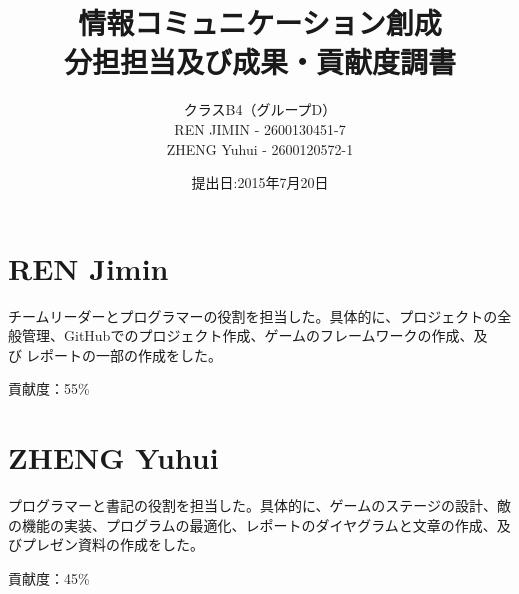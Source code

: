 \documentclass{jarticle}
\title{情報コミュニケーション創成\\分担担当及び成果・貢献度調書}
\author{クラスB4（グループD）\\REN JIMIN - 2600130451-7\\ZHENG Yuhui - 2600120572-1}
\date{提出日:2015年7月20日}
\begin{document}
\maketitle
	\section{REN Jimin}
		チームリーダーとプログラマーの役割を担当した。具体的に、プロジェクトの全般管理、GitHubでのプロジェクト作成、ゲームのフレームワークの作成、及びレポートの一部の作成をした。
		
		貢献度：55\%
	\section{ZHENG Yuhui}
		プログラマーと書記の役割を担当した。具体的に、ゲームのステージの設計、敵の機能の実装、プログラムの最適化、レポートのダイヤグラムと文章の作成、及びプレゼン資料の作成をした。
		
		貢献度：45\%
\end{document}
